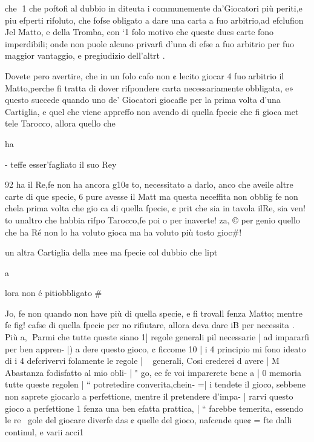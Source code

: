 \documentclass[11pt,a6paper]{article}
\begin{document}
che
1
che poftofi al dubbio in diteuta
i communemente da’Giocatori più periti,e piu efperti rifoluto, che fofse obligato a dare una
carta a fuo arbitrio,ad efclufion
Jel Matto, e della Tromba, con
‘1 folo motivo che queste dues
carte fono imperdibili; onde
non puole alcuno privarfi d’una
di efse a fuo arbitrio per fuo
maggior vantaggio, e pregiudizio dell’altrt .

Dovete pero avertire, che in
un folo cafo non ¢ lecito giocar
4 fuo arbitrio il Matto,perche fi
tratta di dover rifpondere carta
necessariamente obbligata, e»
questo succede quando uno de’
Giocatori giocafle per la prima
volta d’una Cartiglia, e quel
che viene appreffo non avendo
di quella fpecie che fi gioca met
tele Tarocco, allora quello che

ha
 

 

 

 

 

 

 

- teffe esser’fagliato il suo Rey

92
ha il Re,fe non ha ancora g10¢
to, necessitato a darlo, anco
che aveile altre carte di que
specie, 6 pure avesse il Matt
ma questa neceffita non obblig
fe non chela prima volta che
gio ca di quella fpecie, ¢ prit
che sia in tavola ilRe, sia ven!
to unaltro che habbia rifpo
Tarocco,fe poi o per inaverte!
za, © per genio quello che ha
Ré non lo ha voluto gioca
ma ha voluto più tosto gioc#!

un altra Cartiglia della mee
ma fpecie col dubbio che lipt

a

lora non é pitiobbligato #

Jo, fe non quando non have
più di quella specie, e fi trovall
fenza Matto; mentre fe fig!
cafse di quella fpecie per no
rifiutare, allora deva dare iB
per necessita . Più
a,
Parmi che tutte queste siano 1]
regole generali pil necessarie |
ad impararfi per ben appren- |)
a dere questo gioco, ¢ ficcome 10 |
i 4 principio mi fono ideato di i
4 defcrivervi folamente le regole |
~ generali, Cosi crederei d avere |
M Abastanza fodisfatto al mio obli- |
" go, ee fe voi imparerete bene a |
0 memoria tutte queste regolen |
“ potretedire converita,chein- =|
i tendete il gioco, sebbene non
 saprete giocarlo a perfettione,
mentre il pretendere d’impa- |
rarvi questo gioco a perfettione 1
fenza una ben efatta prattica, |
“  farebbe temerita, essendo le re~ gole del giocare diverfe das
¢ quelle del gioco, nafcende que¢ = fte dalli continul, e varii acci1
\end{document}
